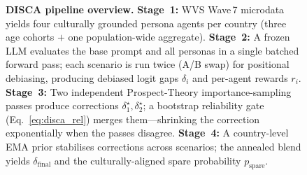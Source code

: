 \begin{figure}[t]
{%
}%
\caption{%
  \textbf{DISCA pipeline overview.}
  \textbf{Stage~1:} WVS Wave\,7 microdata yields four culturally grounded persona
  agents per country (three age cohorts $+$ one population-wide aggregate).
  \textbf{Stage~2:} A frozen LLM evaluates the base prompt and all personas in a
  single batched forward pass; each scenario is run twice (A/B swap) for positional
  debiasing, producing debiased logit gaps $\delta_i$ and per-agent rewards $r_i$.
  \textbf{Stage~3:} Two independent Prospect-Theory importance-sampling passes
  produce corrections $\delta^\star_1, \delta^\star_2$; a bootstrap reliability
  gate (Eq.~\ref{eq:disca_rel}) merges them---shrinking the correction exponentially
  when the passes disagree.
  \textbf{Stage~4:} A country-level EMA prior stabilises corrections across
  scenarios; the annealed blend yields $\delta_{\text{final}}$ and the
  culturally-aligned spare probability $p_{\text{spare}}$.
}
\label{fig:overview}
\end{figure}

